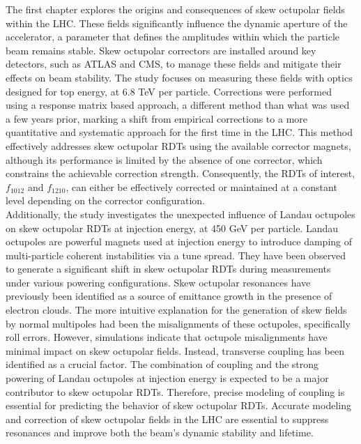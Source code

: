 {%
The first chapter explores the origins and consequences of skew octupolar fields within the LHC.
These fields significantly influence the dynamic aperture of the accelerator, a parameter
that defines the amplitudes within which the particle beam remains stable. Skew octupolar correctors
are installed around key detectors, such as ATLAS and CMS, to manage these fields and mitigate their
effects on beam stability. The study focuses on measuring these fields with optics designed for top
energy, at 6.8 TeV per particle. Corrections were performed using a response matrix based approach,
a different method than what was used a few years prior, marking a shift from empirical corrections
to a more quantitative and systematic approach for the first time in the LHC. 
This method effectively addresses skew octupolar RDTs using the available corrector magnets,
although its performance is limited by the absence of one corrector, which constrains the achievable
correction strength. Consequently, the RDTs of interest, $f_{1012}$ and $f_{1210}$, can either be
effectively corrected or maintained at a constant level depending on the corrector configuration.
\\
\indent
Additionally, the study investigates the unexpected influence of Landau octupoles on skew octupolar
RDTs at injection energy, at 450 GeV per particle. Landau octupoles are powerful magnets used
at injection energy to introduce damping of multi-particle coherent instabilities via a tune
spread. They have been observed to generate a significant shift in skew octupolar RDTs during
measurements under various powering configurations. Skew octupolar resonances have previously been
identified as a source of emittance growth in the presence of electron clouds. The more intuitive
explanation for the generation of skew fields by normal multipoles had been the misalignments of
these octupoles, specifically roll errors. However, simulations indicate that octupole misalignments
have minimal impact on skew octupolar fields. Instead, transverse coupling has been identified as a
crucial factor. The combination of coupling and the strong powering of Landau octupoles at injection
energy is expected to be a major contributor to skew octupolar RDTs. Therefore, precise modeling of
coupling is essential for predicting the behavior of skew octupolar RDTs. Accurate modeling and
correction of skew octupolar fields in the LHC are essential to suppress resonances and improve both
the beam's dynamic stability and lifetime.


}
